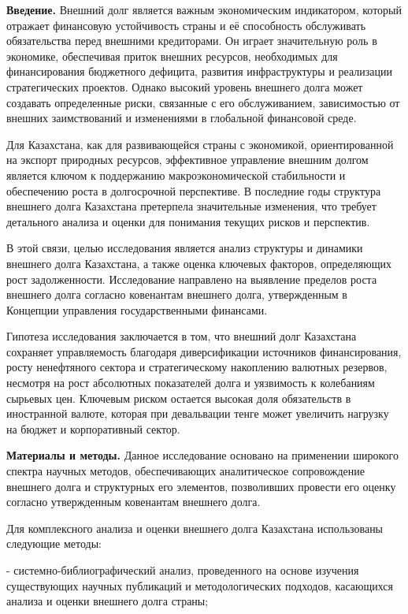 \begin{multicols}{2}
{\bfseries Введение.} Внешний долг является важным экономическим
индикатором, который отражает финансовую устойчивость страны и её
способность обслуживать обязательства перед внешними кредиторами. Он
играет значительную роль в экономике, обеспечивая приток внешних
ресурсов, необходимых для финансирования бюджетного дефицита, развития
инфраструктуры и реализации стратегических проектов. Однако высокий
уровень внешнего долга может создавать определенные риски, связанные с
его обслуживанием, зависимостью от внешних заимствований и изменениями в
глобальной финансовой среде.

Для Казахстана, как для развивающейся страны с экономикой,
ориентированной на экспорт природных ресурсов, эффективное управление
внешним долгом является ключом к поддержанию макроэкономической
стабильности и обеспечению роста в долгосрочной перспективе. В последние
годы структура внешнего долга Казахстана претерпела значительные
изменения, что требует детального анализа и оценки для понимания текущих
рисков и перспектив.

В этой связи, целью исследования является анализ структуры и динамики
внешнего долга Казахстана, а также оценка ключевых факторов,
определяющих рост задолженности. Исследование направлено на выявление
пределов роста внешнего долга согласно ковенантам внешнего долга,
утвержденным в Концепции управления государственными финансами.

Гипотеза исследования заключается в том, что внешний долг Казахстана
сохраняет управляемость благодаря диверсификации источников
финансирования, росту ненефтяного сектора и стратегическому накоплению
валютных резервов, несмотря на рост абсолютных показателей долга и
уязвимость к колебаниям сырьевых цен. Ключевым риском остается высокая
доля обязательств в иностранной валюте, которая при девальвации тенге
может увеличить нагрузку на бюджет и корпоративный сектор.

{\bfseries Материалы и методы.} Данное исследование основано на применении
широкого спектра научных методов, обеспечивающих аналитическое
сопровождение внешнего долга и структурных его элементов, позволивших
провести его оценку согласно утвержденным ковенантам внешнего долга.

Для комплексного анализа и оценки внешнего долга Казахстана использованы
следующие методы:

- системно-библиографический анализ, проведенного на основе изучения
существующих научных публикаций и методологических подходов, касающихся
анализа и оценки внешнего долга страны;


\end{multicols}
